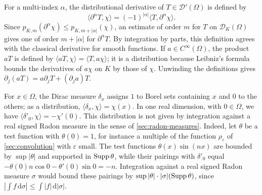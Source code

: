 For a multi-index $\alpha$, the distributional derivative of $T\in\mathcal D'(\Omega)$ is defined by
\[
 \langle\partial^\alpha T,\chi\rangle=(-1)^{|\alpha|}\langle T,\partial^\alpha\chi\rangle.
\]
Since $p_{K,m}(\partial^\alpha\chi)\leq p_{K,m+|\alpha|}(\chi)$, an estimate of order $m$ for $T$ on $\mathcal D_K(\Omega)$ gives one of order $m+|\alpha|$ for $\partial^\alpha T$. By integration by parts, this definition agrees with the classical derivative for smooth functions. If $a\in C^\infty(\Omega)$, the product $aT$ is defined by $\langle aT,\chi\rangle=\langle T,a\chi\rangle$; it is a distribution because Leibniz's formula bounds the derivatives of $a\chi$ on $K$ by those of $\chi$. Unwinding the definitions gives $\partial_j(aT)=a\partial_jT+(\partial_ja)T$.

\begin{example}\label{ex:dirac-derivative}
For $x\in\Omega$, the Dirac measure $\delta_x$ assigns $1$ to Borel sets containing $x$ and $0$ to the others; as a distribution, $\langle\delta_x,\chi\rangle=\chi(x)$. In one real dimension, with $0\in\Omega$, we have $\langle\delta'_0,\chi\rangle=-\chi'(0)$. This distribution is not given by integration against a real signed Radon measure in the sense of \cref{sec:radon-measures}. Indeed, let $\theta$ be a test function with $\theta(0)=1$, for instance a multiple of the function $\rho_\varepsilon$ of \cref{sec:convolution} with $\varepsilon$ small. The test functions $\theta(x)\sin(nx)$ are bounded by $\sup|\theta|$ and supported in $\operatorname{Supp}\theta$, while their pairings with $\delta'_0$ equal $-\theta(0)n\cos0-\theta'(0)\sin0=-n$. Integration against a real signed Radon measure $\sigma$ would bound these pairings by $\sup|\theta|\cdot|\sigma|(\operatorname{Supp}\theta)$, since $|\int f\,\mathrm d\sigma|\leq\int|f|\,\mathrm d|\sigma|$.
\end{example}

